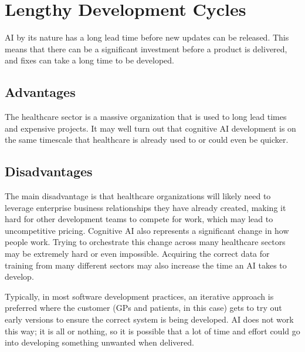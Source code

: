 \documentclass{article}
\begin{document}
\section{Lengthy Development Cycles}
AI by its nature has a long lead time before new updates can be released. This means that there can be a significant investment before a product is delivered, and fixes can take a long time to be developed.

\subsection{Advantages}
The healthcare sector is a massive organization that is used to long lead times and expensive projects. It may well turn out that cognitive AI development is on the same timescale that healthcare is already used to or could even be quicker.

\subsection{Disadvantages}
The main disadvantage is that healthcare organizations will likely need to leverage enterprise business relationships they have already created, making it hard for other development teams to compete for work, which may lead to uncompetitive pricing. Cognitive AI also represents a significant change in how people work. Trying to orchestrate this change across many healthcare sectors may be extremely hard or even impossible. Acquiring the correct data for training from many different sectors may also increase the time an AI takes to develop.

Typically, in most software development practices, an iterative approach is preferred where the customer (GPs and patients, in this case) gets to try out early versions to ensure the correct system is being developed. AI does not work this way; it is all or nothing, so it is possible that a lot of time and effort could go into developing something unwanted when delivered.

\break

\end{document}
